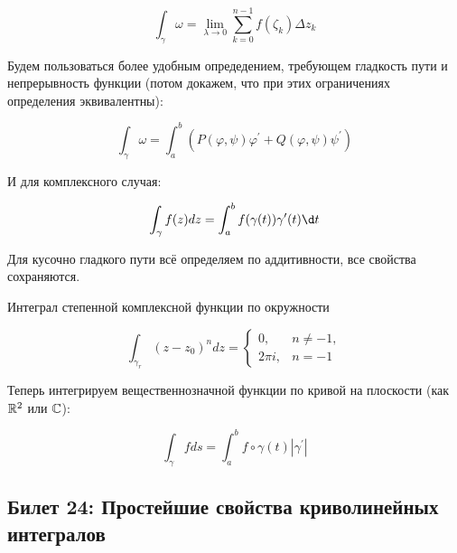 \documentclass[12pt, a4paper, oneside]{memoir}
\begin{document}
\begin{equation}
    \int_\gamma \omega=\lim _{\lambda \rightarrow 0} \sum_{k=0}^{n-1} f\left(\zeta_k\right) \Delta z_k
\end{equation}


Будем пользоваться более удобным опредедением, требующем гладкость пути и непрерывность функции 
(потом докажем, что при этих ограничениях определения эквивалентны):

\begin{equation}
    \int_\gamma \omega=\int_a^b\left(P(\varphi, \psi) \varphi^{\prime}+Q(\varphi, \psi) \psi^{\prime}\right)
\end{equation}

И для комплексного случая:

\begin{equation}
    \int_\gamma f(z) d z=\int_a^b f(\gamma(t)) \gamma^{\prime}(t) \d t
\end{equation}

\begin{remark}
    Для кусочно гладкого пути всё определяем по аддитивности, все свойства сохраняются.
\end{remark}


\begin{example}
    Интеграл степенной комплексной функции по окружности
    
    \begin{equation}
        \int_{\gamma_r}\left(z-z_0\right)^n d z = \begin{cases} 0, & n \neq-1, \\ 2 \pi i, & n=-1 \end{cases}
    \end{equation}
\end{example}


\begin{definition} 
    
    Теперь интегрируем вещественнозначной функции по кривой на плоскости (как ${\mathbb{R}}^2$ или ${\mathbb{C}}$):

    \begin{equation}
        \int_\gamma f d s = \int_a^b f \circ \gamma(t) |\gamma^{\prime}|
    \end{equation}
\end{definition}



\subsection{Билет 24: Простейшие свойства криволинейных интегралов}
\end{document}
